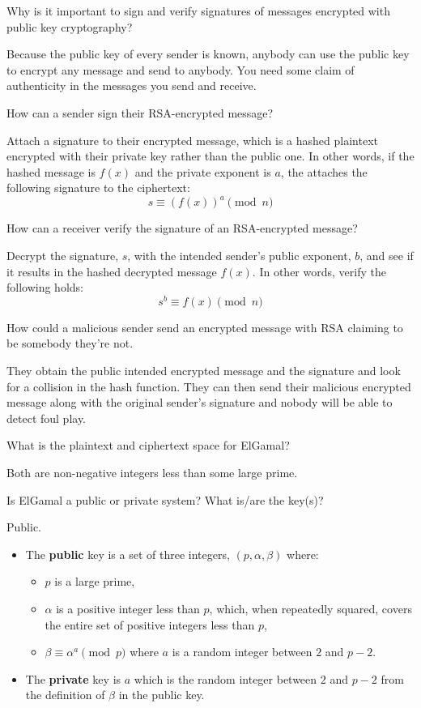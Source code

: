 \documentclass{article}
\newcounter{qcounter}
\newcommand{\showqcounter}{\theqcounter}
\newcommand{\question}{\vspace{5mm}\addtocounter{qcounter}{1}\vspace{5mm}{\bf Q\showqcounter: }}
\newcommand{\answer}{\vspace{5mm}{\bf A\showqcounter: }}
\begin{document}
\question Why is it important to sign and verify signatures of messages encrypted with public key cryptography?

\answer Because the public key of every sender is known, anybody can use the public key to encrypt any message and send to anybody. 
  You need some claim of authenticity in the messages you send and receive.


\question How can a sender sign their RSA-encrypted message?

\answer Attach a signature to their encrypted message, which is a hashed plaintext encrypted with their private key rather than the public one.
  In other words, if the hashed message is $f(x)$ and the private exponent is $a$, the attaches the following signature to the ciphertext:
  $$
    s \equiv \left(f(x)\right)^a \pmod{n}
  $$


\question How can a receiver verify the signature of an RSA-encrypted message?

\answer Decrypt the signature, $s$, with the intended sender's public exponent, $b$, and see if it results in the hashed decrypted message $f(x)$.
  In other words, verify the following holds:
  $$
    s^b \equiv f(x) \pmod{n}
  $$


\question How could a malicious sender send an encrypted message with RSA claiming to be somebody they're not.

\answer They obtain the public intended encrypted message and the signature and look for a collision in the hash function. 
  They can then send their malicious encrypted message along with the original sender's signature and nobody will be able to 
  detect foul play.


\question What is the plaintext and ciphertext space for ElGamal?

\answer Both are non-negative integers less than some large prime.


\question Is ElGamal a public or private system? What is/are the key(s)?

\answer Public. 
  \begin{itemize}
    \item The {\bf public} key is a set of three integers, $(p, \alpha, \beta)$ where:
      \begin{itemize}
        \item $p$ is a large prime,
        \item $\alpha$ is a positive integer less than $p$, which, when repeatedly squared, 
          covers the entire set of positive integers less than $p$,
        \item $\beta \equiv \alpha^a \pmod{p}$ where $a$ is a random integer between $2$ and $p - 2$.
      \end{itemize}
    \item The {\bf private} key is $a$ which is the random integer between $2$ and $p - 2$ from the 
      definition of $\beta$ in the public key.
  \end{itemize}
\end{document}
